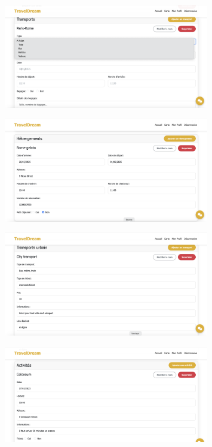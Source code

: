 \documentclass[a4paper,12pt]{article}
\begin{document}
\begin{figure}[H]
    \centering
    \includegraphics[width=0.8\textwidth]{8_creation_voyage_3_1.png}
\end{figure}
\begin{figure}[H]
    \centering
    \includegraphics[width=0.8\textwidth]{8_creation_voyage_4.png}
\end{figure}
\begin{figure}[H]
    \centering
    \includegraphics[width=0.8\textwidth]{8_creation_voyage_5.png}
\end{figure}
\begin{figure}[H]
    \centering
    \includegraphics[width=0.8\textwidth]{8_creation_voyage_6.png}
\end{figure}
\end{document}
